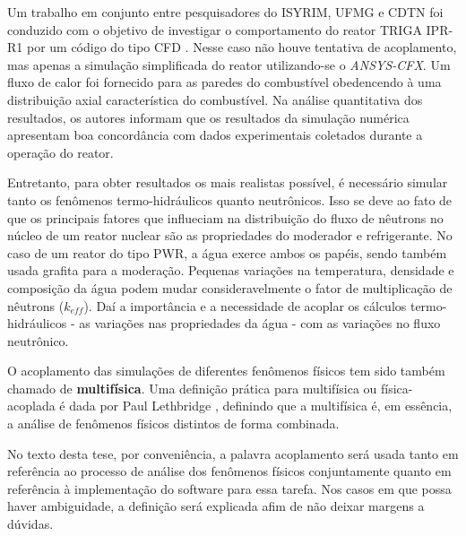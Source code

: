 Um trabalho em conjunto entre pesquisadores do ISYRIM, UFMG e CDTN foi conduzido
com o objetivo de investigar o comportamento do reator TRIGA IPR-R1 por um código do tipo CFD \cite{Martinez2012}. 
Nesse caso não houve tentativa de acoplamento, mas apenas a simulação simplificada 
do reator utilizando-se o \textit{ANSYS-CFX}. Um fluxo de calor 
foi fornecido para as paredes do combustível obedencendo à uma distribuição axial 
característica do combustível. Na análise quantitativa dos resultados, os autores 
informam que os resultados da simulação numérica apresentam boa concordância com 
dados experimentais coletados durante a operação do reator.


Entretanto, para obter resultados os mais realistas possível, é necessário simular 
tanto os fenômenos termo-hidráulicos quanto neutrônicos. Isso 
se deve ao fato de que os principais fatores que influeciam na distribuição do fluxo de 
nêutrons no núcleo de um reator nuclear são as propriedades do moderador e refrigerante. No caso de um
reator do tipo PWR, a água exerce ambos os papéis, sendo também usada grafita para 
a moderação. Pequenas variações na temperatura, densidade e composição 
da água podem mudar consideravelmente o fator de multiplicação de nêutrons ($k_{eff}$). Daí a importância e 
a necessidade de acoplar os cálculos termo-hidráulicos - as variações nas propriedades da água - com as variações 
no fluxo neutrônico.

O acoplamento das simulações de diferentes fenômenos físicos tem sido também chamado de
\textbf{multifísica}. 
Uma definição prática para multifísica ou física-acoplada é dada por Paul Lethbridge \cite{Lethbridge2005}, definindo que 
a multifísica é, em essência, a análise de fenômenos físicos distintos de forma combinada.

No texto desta tese, 
por conveniência, a palavra acoplamento será usada tanto em referência ao processo de análise dos fenômenos físicos conjuntamente 
quanto em referência à implementação do software para essa tarefa. Nos casos em que possa haver ambiguidade, 
a definição será explicada afim de não deixar margens a dúvidas.

